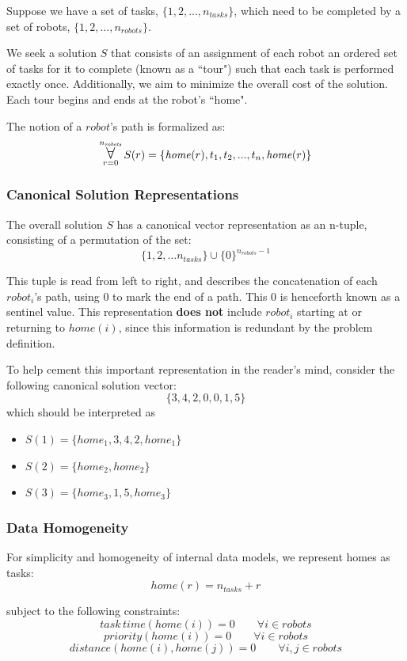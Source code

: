 \documentclass[a4paper]{article}
\newcommand\Forall{\mathop{\mbox{\Large $\mathsurround0pt\forall$}}}
\begin{document}
Suppose we have a set of tasks, $\{1, 2, ..., n_\mathit{tasks}\}$, which need to be completed by a set of robots, $\{1, 2, ..., n_\mathit{robots}\}$.

We seek a solution $S$ that consists of an assignment of each robot an ordered set of tasks for it to complete (known as a ``tour") such that each task is performed exactly once. Additionally, we aim to minimize the overall cost of the solution. Each tour begins and ends at the robot's ``home".

The notion of a $robot$'s path is formalized as:
$$
\Forall_{r=0}^{n_\mathit{robots}}
S(r) = \{ \mathit{home}(r), t_1, t_2, ..., t_n, \mathit{home}(r) \}
$$

\subsubsection{Canonical Solution Representations}
The overall solution $S$ has a canonical vector representation as an n-tuple, consisting of a permutation of the set:
$$
\{1, 2, \dots n_{tasks}\} \cup \{0\}^{n_{robots}-1}
$$

This tuple is read from left to right, and describes the concatenation of each $robot_i$'s path, using 0 to mark the end of a path. This 0 is henceforth known as a sentinel value. This representation \textbf{does not} include $robot_i$ starting at or returning to $\mathit{home}(i)$, since this information is redundant by the problem definition.

To help cement this important representation in the reader's mind, consider the following canonical solution vector:
$$
\{3,4,2,0,0,1,5\}
$$
which should be interpreted as
\begin{itemize}
\item $S(1) = \{ home_1, 3, 4, 2, home_1 \}$
\item $S(2) = \{ home_2, home_2 \}$
\item $S(3) = \{ home_3, 1, 5, home_3 \}$
\end{itemize}

\subsubsection{Data Homogeneity}

For simplicity and homogeneity of internal data models, we represent homes as tasks:
$$\mathit{home}(r) = n_\mathit{tasks} + r$$

subject to the following constraints:
$$
\mathit{task\,time}(\mathit{home}(i)) = 0 \qquad \forall i \in \mathit{robots}
$$
$$
\mathit{priority}(\mathit{home}(i)) = 0 \qquad \forall i \in \mathit{robots}
$$
$$
\mathit{distance}(\mathit{home}(i), \mathit{home}(j)) = 0 \qquad \forall i, j \in \mathit{robots}
$$
\end{document}
